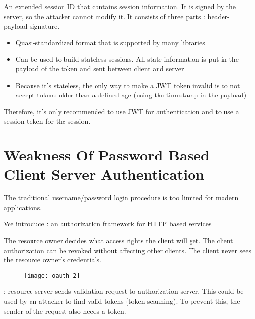 An extended session ID that contains session information. It is signed by the server, so the attacker cannot modify it. It consists of three parts : header-payload-signature.

\begin{minipage}[t]{0.48\textwidth}
    \begin{itemize}
        \item Quasi-standardized format that is supported by many libraries
        \item Can be used to build stateless sessions. All state information is put in the payload of the token and sent between client and server
    \end{itemize}
\end{minipage}
\hfill
\begin{minipage}[t]{0.48\textwidth}
    \begin{itemize}
        \item Because it’s stateless, the only way to make a JWT token invalid is to not accept tokens older than a defined age (using the timestamp in the payload)
    \end{itemize}
\end{minipage}

Therefore, it’s only recommended to use JWT for authentication and to use a session token for the session.

\section{Weakness Of Password Based Client Server Authentication}

The traditional username/password login procedure is too limited for modern applications. 

We introduce  : an authorization framework for HTTP based services

The resource owner decides what access rights the client will get. The client authorization can be revoked without affecting other clients. The client never sees the resource owner's credentials.

\begin{figure}[H]
    \centering
    \texttt{[image: oauth\_2]}
\end{figure}

 : resource server sends validation request to authorization server. This could be used by an attacker to find valid tokens (token scanning). To prevent this, the sender of the request also needs a token.

